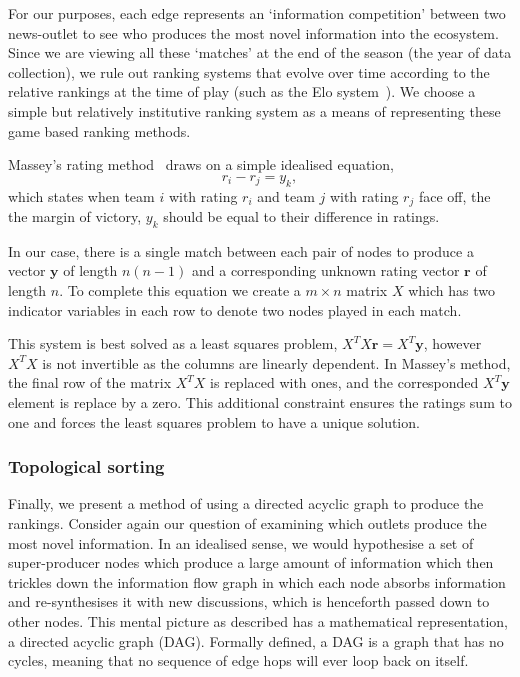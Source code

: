 For our purposes, each edge represents an `information competition' between two news-outlet to see who produces the most novel information into the ecosystem. Since we are viewing all these `matches' at the end of the season (the year of data collection), we rule out ranking systems that evolve over time according to the relative rankings at the time of play (such as the Elo system~\cite{elo_rating_1978}). We choose a simple but relatively institutive ranking system as a means of representing these game based ranking methods.


Massey's rating method~\cite{massey_statistical_1997,langville_whos_2012} draws on a simple idealised equation,
\begin{equation}
r_i- r_j=y_k,
\end{equation}
which states when team $i$ with rating $r_i$ and team $j$ with rating $r_j$ face off, the the margin of victory, $y_k$ should be equal to their difference in ratings.

In our case, there is a single match between each pair of nodes to produce a vector $\mathbf{y}$ of length  $n(n-1)$ and a corresponding unknown rating vector $\mathbf{r}$ of length $n$. To complete this equation we create a $m\times n$ matrix $X$ which has two indicator variables in each row to denote two nodes played in each match.

This system is best solved as a least squares problem, $X^TX\mathbf{r}=X^T\mathbf{y}$, however $X^TX$ is not invertible as the columns are linearly dependent. In Massey's method, the final row of the matrix $X^TX$ is replaced with ones, and the corresponded $X^T\mathbf{y}$ element is replace by a zero. This additional constraint ensures the ratings sum to one and forces the least squares problem to have a unique solution.

\subsubsection{Topological sorting}

Finally, we present a method of using a directed acyclic graph to produce the rankings. Consider again our question of examining which outlets produce the most novel information. In an idealised sense, we would hypothesise a set of super-producer nodes which produce a large amount of information which then trickles down the information flow graph in which each node absorbs information and re-synthesises it with new discussions, which is henceforth passed down to other nodes. This mental picture as described has a mathematical representation, a directed acyclic graph (DAG). Formally defined, a DAG is a graph that has no cycles, meaning that no sequence of edge hops will ever loop back on itself.

